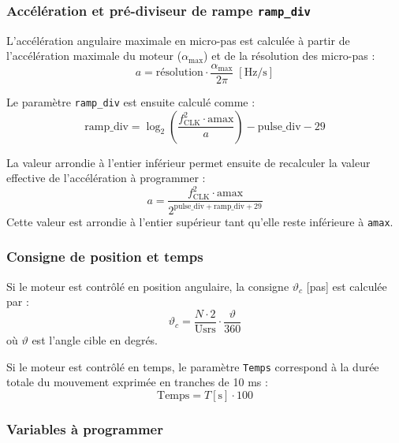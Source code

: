 \subsubsection{Accélération et pré-diviseur de rampe \texttt{ramp\_div}}

L’accélération angulaire maximale en micro-pas est calculée à partir de l’accélération maximale du moteur (\(\alpha_{\max}\)) et de la résolution des micro-pas :
\begin{equation}
a = \text{résolution} \cdot \frac{\alpha_{\max}}{2\pi} \; [\text{Hz/s}]
\end{equation}

Le paramètre \texttt{ramp\_div} est ensuite calculé comme :
\begin{equation}
\text{ramp\_div} = \log_2 \left( \frac{f_{\text{CLK}}^2 \cdot \text{amax}}{a} \right) - \text{pulse\_div} - 29
\end{equation}

La valeur arrondie à l’entier inférieur permet ensuite de recalculer la valeur effective de l’accélération à programmer :
\begin{equation}
a = \frac{f_{\text{CLK}}^2 \cdot \text{amax}}{2^{\text{pulse\_div} + \text{ramp\_div} + 29}}
\end{equation}
Cette valeur est arrondie à l’entier supérieur tant qu’elle reste inférieure à \texttt{amax}.

\subsubsection{Consigne de position et temps}

Si le moteur est contrôlé en position angulaire, la consigne \(\vartheta_c\) [pas] est calculée par :
\begin{equation}
\vartheta_c = \frac{N \cdot 2}{\text{Usrs}} \cdot \frac{\vartheta}{360}
\end{equation}
où \(\vartheta\) est l’angle cible en degrés.  

Si le moteur est contrôlé en temps, le paramètre \texttt{Temps} correspond à la durée totale du mouvement exprimée en tranches de 10 ms :
\begin{equation}
\text{Temps} = T[\text{s}] \cdot 100
\end{equation}

\subsubsection{Variables à programmer}

